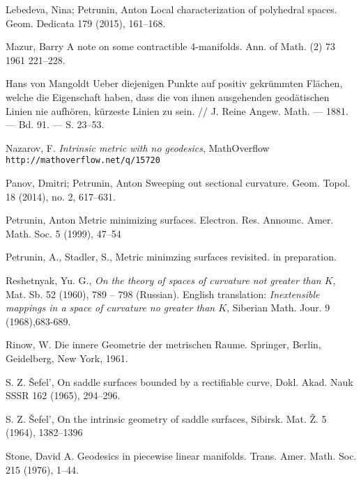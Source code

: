 \begin{thebibliography}{52}
 Lebedeva, Nina; Petrunin, Anton Local characterization of polyhedral spaces. Geom. Dedicata 179 (2015), 161--168.

Mazur, Barry A note on some contractible 4-manifolds. Ann. of Math. (2) 73 1961 221--228.

Hans von Mangoldt Ueber diejenigen Punkte auf positiv gekr\"ummten Fl\"achen, welche die Eigenschaft haben, dass die von ihnen ausgehenden geod\"atischen Linien nie aufh\"oren, k\"urzeste Linien zu sein. // J. Reine Angew. Math. --- 1881. --- Bd. 91. --- S. 23--53.

Nazarov, F.
\textit{Intrinsic metric with no geodesics},
MathOverflow \texttt{http://mathoverflow.net/q/15720}

Panov, Dmitri; Petrunin, Anton
Sweeping out sectional curvature. 
Geom. Topol. 18 (2014), no. 2, 617--631. 

 Petrunin, Anton
Metric minimizing surfaces. 
Electron. Res. Announc. Amer. Math. Soc. 5 (1999), 47--54

  Petrunin, A., Stadler, S., 
Metric minimzing surfaces revisited. in preparation.

Reshetnyak, Yu. G.,
\textit{On the theory of spaces of curvature not greater than $K$},
 Mat. Sb. 52 (1960), 789 -- 798 (Russian).
English translation: \textit{Inextensible mappings in a space of curvature
no greater than $K$}, Siberian Math. Jour. 9 (1968),683-689.

Rinow, W. Die innere Geometrie der metrischen Raume. Springer, Berlin, Geidelberg, New York, 1961.

 S. Z. \v{S}efel', On saddle surfaces bounded by a rectifiable curve, Dokl. Akad. Nauk SSSR 162 (1965), 294--296.

 S. Z. \v{S}efel', On the intrinsic geometry of saddle surfaces, Sibirsk. Mat. \v{Z}. 5 (1964), 1382--1396

Stone, David A.
Geodesics in piecewise linear manifolds.
Trans. Amer. Math. Soc. 215 (1976), 1--44.


\end{thebibliography}
